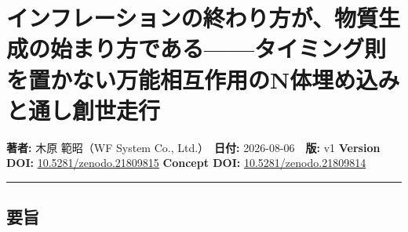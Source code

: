 \documentclass[
  a4paper,
]{ltjsarticle}
\author{}
\date{}
\begin{document}
\section{インフレーションの終わり方が、物質生成の始まり方である------タイミング則を置かない万能相互作用のN体埋め込みと通し創世走行}\label{ux30a4ux30f3ux30d5ux30ecux30fcux30b7ux30e7ux30f3ux306eux7d42ux308fux308aux65b9ux304cux7269ux8ceaux751fux6210ux306eux59cbux307eux308aux65b9ux3067ux3042ux308bux30bfux30a4ux30dfux30f3ux30b0ux5247ux3092ux7f6eux304bux306aux3044ux4e07ux80fdux76f8ux4e92ux4f5cux7528ux306enux4f53ux57cbux3081ux8fbcux307fux3068ux901aux3057ux5275ux4e16ux8d70ux884c}

\textbf{著者:} 木原 範昭（WF System Co., Ltd.）　\textbf{日付:}
2026-08-06　\textbf{版:} v1 \textbf{Version DOI:}
\href{https://doi.org/10.5281/zenodo.21809815}{10.5281/zenodo.21809815}
\textbf{Concept DOI:}
\href{https://doi.org/10.5281/zenodo.21809814}{10.5281/zenodo.21809814}

\begin{center}\rule{0.5\linewidth}{0.5pt}\end{center}

\subsection{要旨}\label{ux8981ux65e8}
\end{document}
